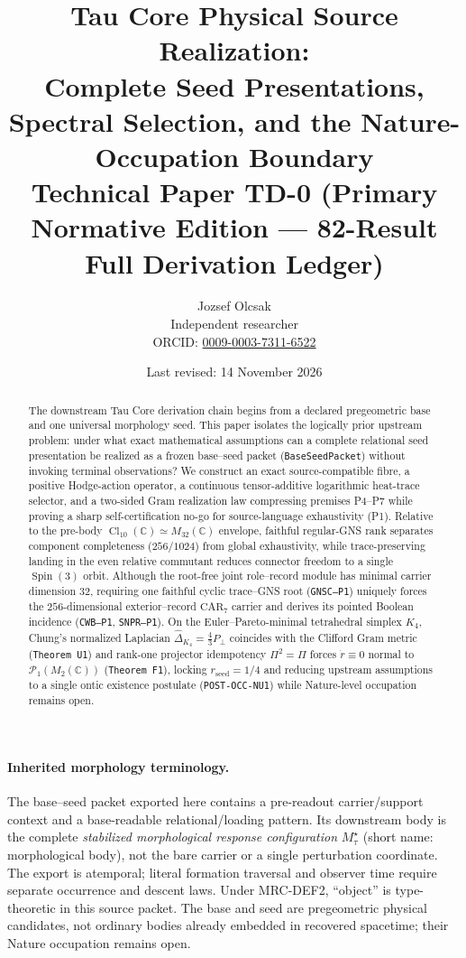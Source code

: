 \documentclass[11pt,a4paper]{article}
\title{\textbf{Tau Core Physical Source Realization:}\\
Complete Seed Presentations, Spectral Selection, and the Nature-Occupation Boundary\\[3pt]
\large Technical Paper TD-0 (Primary Normative Edition --- 82-Result Full Derivation Ledger)}
\author{Jozsef Olcsak\\Independent researcher\\{\small ORCID: \href{https://orcid.org/0009-0003-7311-6522}{0009-0003-7311-6522}}}
\date{Last revised: 14 November 2026}
\theoremstyle{remark}
\begin{document}
\maketitle

\begin{abstract}
The downstream Tau Core derivation chain begins from a declared pregeometric
base and one universal morphology seed.  This paper isolates the logically
prior upstream problem: under what exact mathematical assumptions can a
complete relational seed presentation be realized as a frozen base--seed
packet (\texttt{BaseSeedPacket}) without invoking terminal observations?  We
construct an exact source-compatible fibre, a positive Hodge-action operator,
a continuous tensor-additive logarithmic heat-trace selector, and a two-sided
Gram realization law compressing premises P4--P7 while proving a sharp
self-certification no-go for source-language exhaustivity (P1).  Relative to
the pre-body $\operatorname{Cl}_{10}(\mathbb{C})\simeq M_{32}(\mathbb{C})$
envelope, faithful regular-GNS rank separates component completeness
($256/1024$) from global exhaustivity, while trace-preserving landing in the
even relative commutant reduces connector freedom to a single
$\operatorname{Spin}(3)$ orbit.  Although the root-free joint role--record
module has minimal carrier dimension $32$, requiring one faithful cyclic
trace--GNS root (\texttt{GNSC--P1}) uniquely forces the $256$-dimensional
exterior--record $\mathrm{CAR}_7$ carrier and derives its pointed Boolean
incidence (\texttt{CWB--P1}, \texttt{SNPR--P1}).  On the Euler--Pareto-minimal
tetrahedral simplex $K_4$, Chung's normalized Laplacian
$\widehat{\Delta}_{K_4}=\frac{4}{3}P_\perp$ coincides with the Clifford Gram
metric (\texttt{Theorem U1}) and rank-one projector idempotency $\Pi^2=\Pi$
forces $\dot{r}\equiv 0$ normal to $\mathcal{P}_1(M_2(\mathbb{C}))$
(\texttt{Theorem F1}), locking $r_{\mathrm{seed}}=1/4$ and reducing upstream
assumptions to a single ontic existence postulate (\texttt{POST-OCC-NU1})
while Nature-level occupation remains open.
\end{abstract}

\paragraph{Inherited morphology terminology.}
The base--seed packet exported here contains a pre-readout carrier/support
context and a base-readable relational/loading pattern.  Its downstream body
is the complete \emph{stabilized morphological response configuration}
$M_\tau^\star$ (short name: morphological body), not the bare carrier or a
single perturbation coordinate.  The export is atemporal; literal formation
traversal and observer time require separate occurrence and descent laws.
Under MRC-DEF2, ``object'' is type-theoretic in this source packet. The base
and seed are pregeometric physical candidates, not ordinary bodies already
embedded in recovered spacetime; their Nature occupation remains open.
\end{document}
